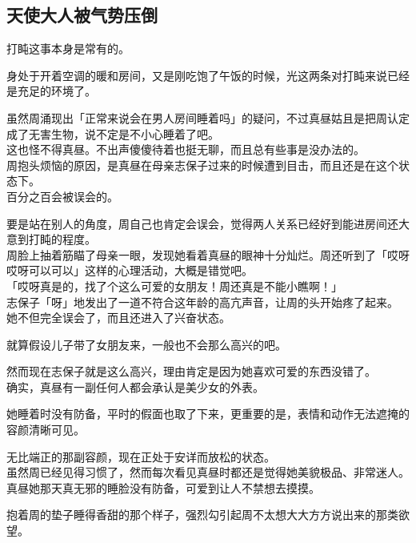 \subsection{天使大人被气势压倒}

打盹这事本身是常有的。

身处于开着空调的暖和房间，又是刚吃饱了午饭的时候，光这两条对打盹来说已经是充足的环境了。

虽然周涌现出「正常来说会在男人房间睡着吗」的疑问，不过真昼姑且是把周认定成了无害生物，说不定是不小心睡着了吧。\\

这也怪不得真昼。不出声傻傻待着也挺无聊，而且总有些事是没办法的。\\

周抱头烦恼的原因，是真昼在母亲志保子过来的时候遭到目击，而且还是在这个状态下。\\

百分之百会被误会的。

要是站在别人的角度，周自己也肯定会误会，觉得两人关系已经好到能进房间还大意到打盹的程度。\\

周脸上抽着筋瞄了母亲一眼，发现她看着真昼的眼神十分灿烂。周还听到了「哎呀哎呀可以可以」这样的心理活动，大概是错觉吧。\\

「哎呀真是的，找了个这么可爱的女朋友！周还真是不能小瞧啊！」\\

志保子「呀」地发出了一道不符合这年龄的高亢声音，让周的头开始疼了起来。\\

她不但完全误会了，而且还进入了兴奋状态。

就算假设儿子带了女朋友来，一般也不会那么高兴的吧。

然而现在志保子就是这么高兴，理由肯定是因为她喜欢可爱的东西没错了。\\

确实，真昼有一副任何人都会承认是美少女的外表。

她睡着时没有防备，平时的假面也取了下来，更重要的是，表情和动作无法遮掩的容颜清晰可见。

无比端正的那副容颜，现在正处于安详而放松的状态。\\

虽然周已经见得习惯了，然而每次看见真昼时都还是觉得她美貌极品、非常迷人。\\

真昼她那天真无邪的睡脸没有防备，可爱到让人不禁想去摸摸。

抱着周的垫子睡得香甜的那个样子，强烈勾引起周不太想大大方方说出来的那类欲望。\\

